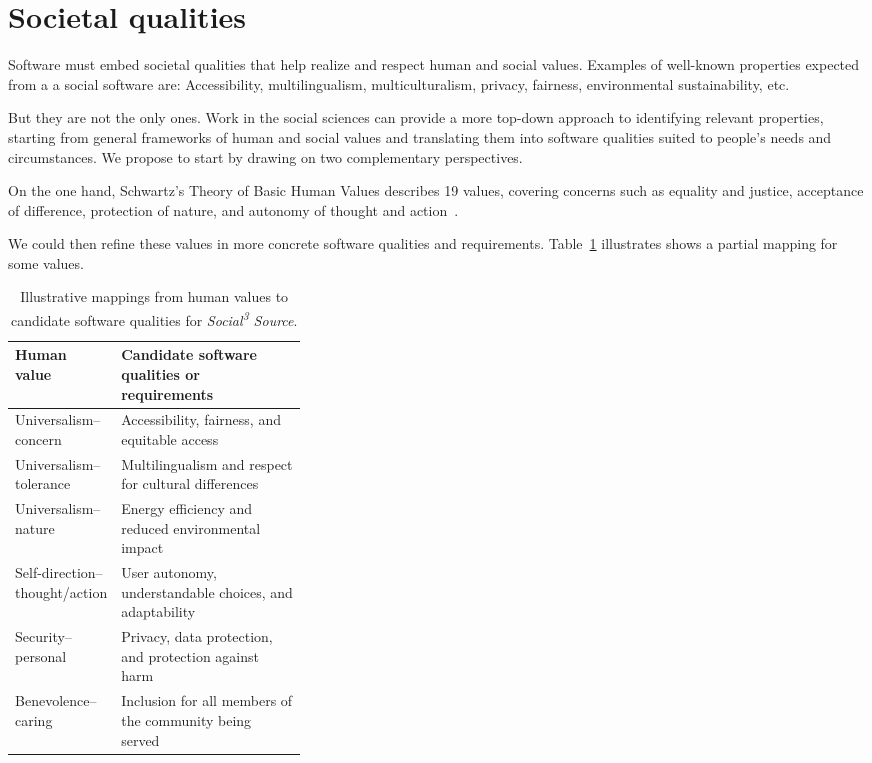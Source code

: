 \documentclass[11pt,a4paper]{article}
\newcommand{\socialsource}{\texorpdfstring{\textit{Social\textsuperscript{3} Source}}{Social3 Source}}
\begin{document}
\section{Societal qualities}
\label{sec:qualities}

Software must embed societal qualities that help realize and respect human and social values. Examples of well-known properties expected from a a social software are: Accessibility, multilingualism, multiculturalism, privacy, fairness, environmental sustainability, etc. 

But they are not the only ones. Work in the social sciences can provide a more top-down approach to identifying relevant properties, starting from general frameworks of human and social values and translating them into software qualities suited to people's needs and circumstances. We propose to start by drawing on two complementary perspectives. 

On the one hand, Schwartz's Theory of Basic Human Values describes 19 values, covering concerns such as equality and justice, acceptance of difference, protection of nature, and autonomy of thought and action~\cite{Schwartz2012Refining}.

We could then refine these values in more concrete software qualities and requirements. Table~\ref{tab:values-qualities} illustrates shows a partial mapping for some values.

\begin{table}[htbp]
\centering
\caption{Illustrative mappings from human values to candidate software qualities for \socialsource{}.}
\label{tab:values-qualities}
\small
\renewcommand{\arraystretch}{1.2}
\begin{tabularx}{\linewidth}{@{}>{\raggedright\arraybackslash}p{0.34\linewidth}>{\raggedright\arraybackslash}X@{}}
\toprule
\textbf{Human value} & \textbf{Candidate software qualities or requirements} \\
\midrule
Universalism--concern & Accessibility, fairness, and equitable access \\
Universalism--tolerance & Multilingualism and respect for cultural differences \\
Universalism--nature & Energy efficiency and reduced environmental impact \\
Self-direction--thought/action & User autonomy, understandable choices, and adaptability \\
Security--personal & Privacy, data protection, and protection against harm \\
Benevolence--caring & Inclusion for all members of the community being served \\
\bottomrule
\end{tabularx}
\end{table}
\end{document}
